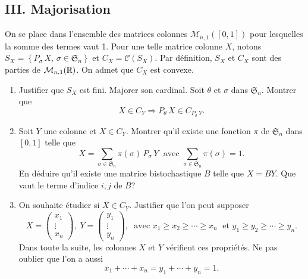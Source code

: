 \subsection*{III. Majorisation}
On se place dans l'ensemble des matrices colonnes $\mathcal{M}_{n,1}(\left[ 0,1\right])$ pour lesquelles la somme des termes vaut 1.\newline
Pour une telle matrice colonne $X$, notons $S_X = \left\lbrace P_{\sigma}\,X, \, \sigma \in \mathfrak{S}_n\right\rbrace$  et $C_X = \mathcal{C}(S_X)$.\newline
Par définition, $S_X$ et $C_X$ sont des parties de $\mathcal{M}_{n,1}(\mathbb{R})$. On admet que $C_X$ est convexe.
\begin{enumerate}
 \item Justifier que $S_X$ est fini. Majorer son cardinal. Soit $\theta$ et $\sigma$ dans $\mathfrak{S}_n$. Montrer que 
\[
 X \in C_Y \Rightarrow P_\theta\,X \in C_{P_\sigma\, Y}.
\]

 \item Soit $Y$ une colonne et $X \in C_Y$. Montrer qu'il existe une fonction $\pi$ de $\mathfrak{S}_n$ dans $[0,1]$ telle que 
\[
 X = \sum_{\sigma \in \mathfrak{S}_n}\pi(\sigma)\,P_\sigma\,Y\; \text{ avec } \sum_{\sigma \in \mathfrak{S}_n}\pi(\sigma) = 1.
\]
En déduire qu'il existe une matrice bistochastique $B$ telle que $X = B Y$. Que vaut le terme d'indice $i,j$ de $B$?

 \item On souhaite étudier si $X \in C_Y$. Justifier que l'on peut supposer
\[
 X =
 \begin{pmatrix}
  x_1 \\ \vdots \\ x_n
 \end{pmatrix}, \;
 Y =
 \begin{pmatrix}
  y_1 \\ \vdots \\ y_n
 \end{pmatrix}, \;
 \text{ avec }
  x_1 \geq x_2 \geq \cdots \geq x_n \;
  \text{ et }
  y_1 \geq y_2 \geq \cdots \geq y_n.
\]
Dans toute la suite, les colonnes $X$ et $Y$ vérifient ces propriétés. Ne pas oublier que l'on a aussi
\[
 x_1 + \cdots + x_n = y_1 + \cdots + y_n = 1.
\]


\end{enumerate}
